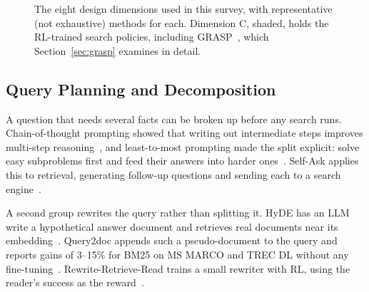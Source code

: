 \documentclass[pdflatex,sn-mathphys-num]{sn-jnl}%
\begin{document}
\begin{figure}[t]
{%
}
\caption{The eight design dimensions used in this survey, with representative (not exhaustive) methods for each. Dimension C, shaded, holds the RL-trained search policies, including GRASP~\cite{gandhi2026grasp}, which Section~\ref{sec:grasp} examines in detail.}
\label{fig:taxonomy}
\end{figure}

\subsection{Query Planning and Decomposition}
\label{sec:planning}
A question that needs several facts can be broken up before any search runs. Chain-of-thought prompting showed that writing out intermediate steps improves multi-step reasoning~\cite{wei2022cot}, and least-to-most prompting made the split explicit: solve easy subproblems first and feed their answers into harder ones~\cite{zhou2023leasttomost}. Self-Ask applies this to retrieval, generating follow-up questions and sending each to a search engine~\cite{press2023selfask}.

A second group rewrites the query rather than splitting it. HyDE has an LLM write a hypothetical answer document and retrieves real documents near its embedding~\cite{gao2023hyde}. Query2doc appends such a pseudo-document to the query and reports gains of 3--15\% for BM25 on MS MARCO and TREC DL without any fine-tuning~\cite{wang2023query2doc}. Rewrite-Retrieve-Read trains a small rewriter with RL, using the reader's success as the reward~\cite{ma2023rewrite}.
\end{document}
